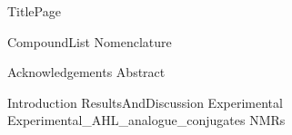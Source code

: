 \documentclass[10pt,a4paper]{article}
\begin{document}
	
{TitlePage}

{CompoundList}
{Nomenclature}

\tableofcontents
\newpage

{Acknowledgements}
{Abstract}

\printnomenclature
\newpage

{Introduction}
{ResultsAndDiscussion}
{Experimental}
{Experimental_AHL_analogue_conjugates}
{NMRs}

\newpage
{}

\end{document}
